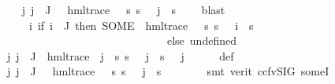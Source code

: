 \begin{isabellebody}
\ \ \isamarkupfalse%
\ {\isachardoublequoteopen}{\isasymAnd}j{\isachardot}{\kern0pt}\ j\ {\isasymin}\ J\ {\isasymLongrightarrow}\ {\isasymexists}{\isasympsi}{\isachardot}{\kern0pt}\ hml{\isacharunderscore}{\kern0pt}trace\ {\isasympsi}\ {\isasymand}\ {\isacharparenleft}{\kern0pt}{\isasymforall}s{\isachardot}{\kern0pt}\ s\ {\isasymTurnstile}\ {\isasymPhi}\ j\ {\isasymlongleftrightarrow}\ s\ {\isasymTurnstile}\ {\isasympsi}{\isacharparenright}{\kern0pt}{\isachardoublequoteclose}\ \isamarkupfalse%
\ blast\isanewline
\ \ \isamarkupfalse%
\ {\isasymPsi}\ \ {\isachardoublequoteopen}{\isasymPsi}\ {\isasymequiv}\ {\isacharparenleft}{\kern0pt}{\isasymlambda}i{\isachardot}{\kern0pt}\ {\isacharparenleft}{\kern0pt}if\ i\ {\isasymin}\ J\ then\ {\isacharparenleft}{\kern0pt}SOME\ {\isasympsi}{\isachardot}{\kern0pt}\ hml{\isacharunderscore}{\kern0pt}trace\ {\isasympsi}\ {\isasymand}\ {\isacharparenleft}{\kern0pt}{\isasymforall}s{\isachardot}{\kern0pt}\ s\ {\isasymTurnstile}\ {\isasymPhi}\ i\ {\isasymlongleftrightarrow}\ s\ {\isasymTurnstile}\ {\isasympsi}{\isacharparenright}{\kern0pt}{\isacharparenright}{\kern0pt}\ \isanewline
\ \ \ \ \ \ \ \ \ \ \ \ \ \ \ \ \ \ \ \ \ \ \ \ \ \ \ \ \ \ else\ undefined{\isacharparenright}{\kern0pt}{\isacharparenright}{\kern0pt}{\isachardoublequoteclose}\isanewline
\ \ \isamarkupfalse%
\ {\isachardoublequoteopen}{\isasymAnd}j{\isachardot}{\kern0pt}\ j\ {\isasymin}\ J\ {\isasymLongrightarrow}\ hml{\isacharunderscore}{\kern0pt}trace\ {\isacharparenleft}{\kern0pt}{\isasymPsi}\ j{\isacharparenright}{\kern0pt}\ {\isasymand}\ {\isacharparenleft}{\kern0pt}{\isasymforall}s{\isachardot}{\kern0pt}\ s\ {\isasymTurnstile}\ {\isasymPhi}\ j\ {\isasymlongleftrightarrow}\ s\ {\isasymTurnstile}\ {\isasymPsi}\ j{\isacharparenright}{\kern0pt}{\isachardoublequoteclose}\isanewline
\ \ \ \ \isamarkupfalse%
\ {\isasymPsi}{\isacharunderscore}{\kern0pt}def\ \isamarkupfalse%
\ {\isacartoucheopen}{\isasymAnd}j{\isachardot}{\kern0pt}\ j\ {\isasymin}\ J\ {\isasymLongrightarrow}\ {\isasymexists}{\isasympsi}{\isachardot}{\kern0pt}\ hml{\isacharunderscore}{\kern0pt}trace\ {\isasympsi}\ {\isasymand}\ {\isacharparenleft}{\kern0pt}{\isasymforall}s{\isachardot}{\kern0pt}\ s\ {\isasymTurnstile}\ {\isasymPhi}\ j\ {\isasymlongleftrightarrow}\ s\ {\isasymTurnstile}\ {\isasympsi}{\isacharparenright}{\kern0pt}{\isacartoucheclose}\isanewline
\ \ \ \ \isamarkupfalse%
\ {\isacharparenleft}{\kern0pt}smt\ {\isacharparenleft}{\kern0pt}verit{\isacharcomma}{\kern0pt}\ ccfv{\isacharunderscore}{\kern0pt}SIG{\isacharparenright}{\kern0pt}\ someI{\isacharparenright}{\kern0pt}\isanewline

\end{isabellebody}
